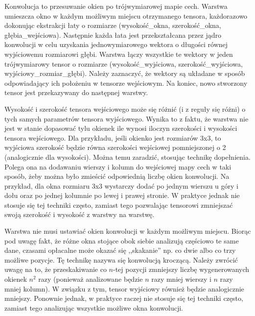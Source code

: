Konwolucja to przesuwanie okien po trójwymiarowej mapie cech. Warstwa umieszcza okno w każdym możliwym miejscu otrzymanego tensora, każdorazowo dokonując ekstrakcji łaty o rozmiarze (wysokość\_okna, szerokość\_okna, głębia\_wejściowa). Następnie każda łata jest przekształcana przez jądro konwolucji w celu uzyskania jednowymiarowego wektora o długości równej wyjściowemu rozmiarowi głębi. Warstwa łączy wszystkie te wektory w jeden trójwymiarowy tensor o rozmiarze (wysokość\_wyjściowa, szerokość\_wyjściowa, wyjściowy\_rozmiar\_głębi). Należy zaznaczyć, że wektory są układane w sposób odpowiadający ich położeniu w tensorze wejściowym. Na koniec, nowo stworzony tensor jest przekazywany do następnej warstwy.

Wysokość i szerokość tensora wejściowego może się różnić (i z reguły się różni) o tych samych parametrów tensora wyjściowego. Wynika to z faktu, że warstwa nie jest w stanie dopasować tylu okienek ile wynosi iloczyn szerokości i wysokości tensora wejściowego. Dla przykładu, jeśli okienko jest rozmiarów 3x3, to wyjściowa szerokość będzie równa szerokości wejściowej pomniejszonej o 2 (analogicznie dla wysokości). Można temu zaradzić, stosując technikę dopełnienia. Polega ona na dodawaniu wierszy i kolumn do wejściowej mapy cech w taki sposób, żeby można było zmieścić odpowiednią liczbę okien konwolucji. Na przykład, dla okna rozmiaru 3x3 wystarczy dodać po jednym wierszu u góry i dołu oraz po jednej kolumnie po lewej i prawej stronie. W praktyce jednak nie stosuje się tej techniki często, zamiast tego pozwalając tensorowi zmniejszać swoją szerokość i wysokość z warstwy na warstwę.

Warstwa nie musi ustawiać okien konwolucji w każdym możliwym miejscu. Biorąc pod uwagę fakt, że różne okna stojące obok siebie analizują częściowo te same dane, czasami opłacalne może okazać się ,,skakanie'' np. co dwie albo co trzy możliwe pozycje. Tę technikę nazywa się konwolucją kroczącą. Należy zwrócić uwagę na to, że przeskakiwanie co $n$-tej pozycji zmniejszy liczbę wygenerowanych okienek $n^2$ razy (ponieważ analizowane będzie $n$ razy mniej wierszy i $n$ razy mniej kolumn). W związku z tym, tensor wyjściowy również będzie analogicznie mniejszy. Ponownie jednak, w praktyce raczej nie stosuje się tej techniki często, zamiast tego analizując wszystkie możliwe okna konwolucji.

